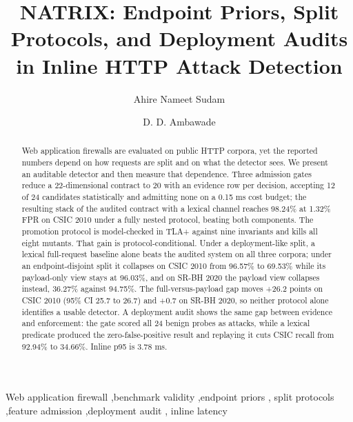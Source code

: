 \documentclass[preprint,11pt]{elsarticle}
\begin{document}
\begin{frontmatter}

\title{NATRIX: Endpoint Priors, Split Protocols, and Deployment Audits
in Inline HTTP Attack Detection}

\author[a]{Ahire Nameet Sudam}
\author[b]{D. D. Ambawade}
\address[a]{Department of Computer Engineering, Sardar Patel Institute of Technology, Munshi Nagar, Andheri (West), Mumbai 400058, Maharashtra, India}
\address[b]{Department of Computer Science and Engineering, Sardar Patel Institute of Technology, Munshi Nagar, Andheri (West), Mumbai 400058, Maharashtra, India}

\begin{abstract}
Web application firewalls are evaluated on public HTTP corpora, yet the
reported numbers depend on how requests are split and on what the
detector sees. We present an auditable detector and then measure that
dependence. Three admission gates reduce a 22-dimensional contract to 20
with an evidence row per decision, accepting 12 of 24 candidates
statistically and admitting none on a 0.15 ms cost budget; the resulting
stack of the audited contract with a lexical channel reaches 98.24\% at
1.32\% FPR on CSIC 2010 under a fully nested protocol, beating both
components. The promotion protocol is model-checked in TLA+ against nine
invariants and kills all eight mutants. That gain is
protocol-conditional. Under a deployment-like split, a lexical
full-request baseline alone beats the audited system on all three
corpora; under an endpoint-disjoint split it collapses on CSIC 2010 from
96.57\% to 69.53\% while its payload-only view stays at 96.03\%, and on
SR-BH 2020 the payload view collapses instead, 36.27\% against 94.75\%.
The full-versus-payload gap moves +26.2 points on CSIC 2010 (95\% CI
25.7 to 26.7) and +0.7 on SR-BH 2020, so neither protocol alone
identifies a usable detector. A deployment audit shows the same gap
between evidence and enforcement: the gate scored all 24 benign probes
as attacks, while a lexical predicate produced the zero-false-positive
result and replaying it cuts CSIC recall from 92.94\% to 34.66\%. Inline
p95 is 3.78 ms.
\end{abstract}

\begin{keyword}
Web application firewall \sep benchmark validity \sep endpoint priors \sep
split protocols \sep feature admission \sep deployment audit \sep
inline latency
\end{keyword}

\end{frontmatter}
\end{document}
